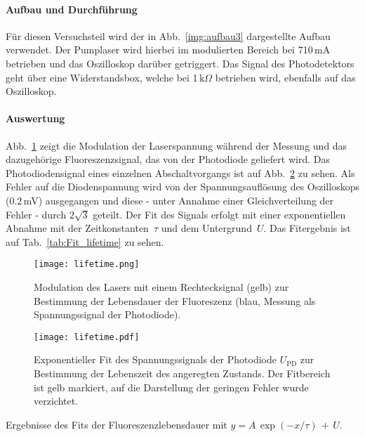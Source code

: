 \paragraph{Aufbau und Durchführung}

Für diesen Versuchsteil wird der in Abb.~\ref{img:aufbau3} dargestellte Aufbau verwendet.
Der Pumplaser wird hierbei im modulierten Bereich bei 710\,mA betrieben und das Oszilloskop darüber
getriggert. Das Signal des Photodetektors geht über eine Widerstandsbox, welche bei 1\,k$\Omega$
betrieben wird, ebenfalls auf das Oszilloskop.

\paragraph{Auswertung}
Abb.~\ref{img:Lifetime} zeigt die Modulation der Laserspannung während der Messung und das
dazugehörige Fluoreszenzsignal, das von der Photodiode geliefert wird.
Das Photodiodensignal eines einzelnen Abschaltvorgangs ist auf Abb.~\ref{img:LifetimeFit} zu sehen. 
Als Fehler auf die Diodenspannung wird von der Spannungsauflösung des Oszilloskops
(0.2\,mV) ausgegangen und diese - unter Annahme einer Gleichverteilung der Fehler - durch
$2\sqrt{3}$ geteilt.
Der Fit des Signals erfolgt mit einer exponentiellen Abnahme mit der Zeitkonstanten~$\tau$ und dem
Untergrund~$U$. Das Fitergebnis ist auf Tab.~\ref{tab:Fit_lifetime} zu sehen.


\begin{figure}[H]
\begin{center}
  \texttt{[image: lifetime.png]}
  \caption{Modulation des Lasers mit einem Rechtecksignal (gelb) zur Bestimmung der Lebensdauer der
  Fluoreszenz (blau, Messung als Spannungssignal der Photodiode).}
  \label{img:Lifetime}
\end{center}
\end{figure}


\begin{figure}[H]
\begin{center}
  \texttt{[image: lifetime.pdf]}
  \caption{Exponentieller Fit des Spannungssignals der Photodiode $U_{\text{PD}}$ zur Bestimmung der
  Lebenszeit des angeregten Zustands. Der Fitbereich ist gelb markiert, auf die Darstellung der
  geringen Fehler wurde verzichtet.}
  \label{img:LifetimeFit}
\end{center}
\end{figure}

\begin{table}[htb]
\caption{Ergebnisse des Fits der Fluoreszenzlebensdauer mit
$y=A\,\exp(-x/\tau)\,+\,U$.}

\label{tab:Fit_lifetime}
\end{table}


